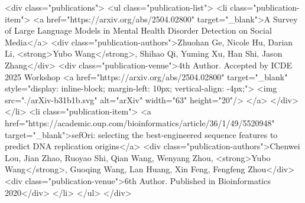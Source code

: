 <div class="publications">
    <ul class="publication-list">
        <li class="publication-item">
            <a href="https://arxiv.org/abs/2504.02800" target="_blank">A Survey of Large Language Models in Mental Health Disorder Detection on Social Media</a>
            <div class="publication-authors">Zhuohan Ge, Nicole Hu, Darian Li, <strong>Yubo Wang</strong>, Shihao Qi, Yuming Xu, Han Shi, Jason Zhang</div>
            <div class="publication-venue">4th Author. Accepted by ICDE 2025 Workshop
            <a href="https://arxiv.org/abs/2504.02800" target="_blank" style="display: inline-block; margin-left: 10px; vertical-align: -4px;">
                    <img src="./arXiv-b31b1b.svg" alt="arXiv" width="63" height="20"/>
            </a>
            </div>
        </li>
        <li class="publication-item">
            <a href="https://academic.oup.com/bioinformatics/article/36/1/49/5520948" target="_blank">sefOri: selecting the best-engineered sequence features to predict DNA replication origins</a>
            <div class="publication-authors">Chenwei Lou, Jian Zhao, Ruoyao Shi, Qian Wang, Wenyang Zhou, <strong>Yubo Wang</strong>, Guoqing Wang, Lan Huang, Xin Feng, Fengfeng Zhou</div>
            <div class="publication-venue">6th Author. Published in Bioinformatics 2020</div>
        </li>
    </ul>
</div>